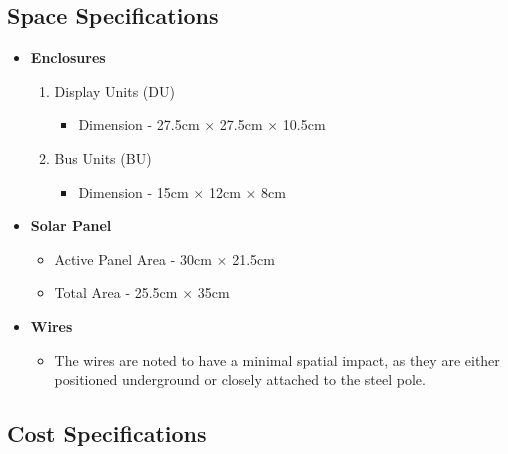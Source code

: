 \documentclass[12pt]{article} %
\begin{document}
\subsection{Space Specifications}
\begin{itemize}
    \item \textbf{ Enclosures}
    \begin{enumerate}
    \item Display Units (DU)
    \begin{itemize}
      \item Dimension - 27.5cm $\times$ 27.5cm $\times$ 10.5cm
    \end{itemize}
    
    \item Bus Units (BU)
    \begin{itemize}
      \item Dimension - 15cm $\times$ 12cm $\times$ 8cm
    \end{itemize}
    \end {enumerate}

    \item \textbf{Solar Panel}
    \begin{itemize}
        \item Active Panel Area - 30cm $\times$ 21.5cm
        \item Total Area - 25.5cm $\times$ 35cm
    \end{itemize}
    
    \item \textbf{Wires}
        \begin{itemize}
            \item  The wires are noted to have a minimal spatial impact, as they are either positioned underground or closely attached to the steel pole.
        \end{itemize}
    
\end{itemize}

\subsection{Cost Specifications}
\end{document}
